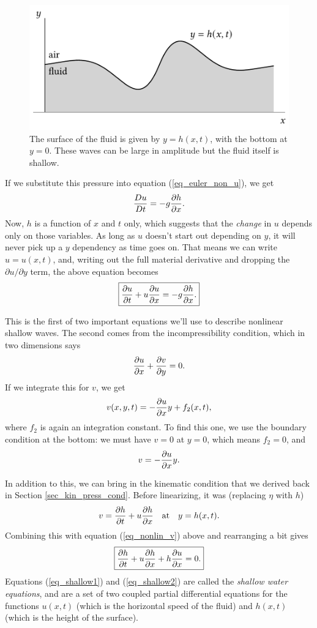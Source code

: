 \begin{figure}
\centering
\includegraphics[width=0.8\linewidth]{Figures/Chapter6/fig_nonlinear_wave}
\caption{The surface of the fluid is given by $y = h(x, t)$, with the bottom at $y=0$.  These waves can be large in amplitude but the fluid itself is shallow. }
\label{fig_nonlinear_wave}
\end{figure}

If we substitute this pressure into equation (\ref{eq_euler_non_u}), we get
\[
\frac{Du}{Dt} = -g \frac{\partial {h}}{\partial {x}}.
\]
Now, $h$ is a function of $x$ and $t$ only, which suggests that the \emph{change} in $u$ depends only on those variables.  As long as $u$ doesn't start out depending on $y$, it will never pick up a $y$ dependency as time goes on.  That means we can write $u = u(x, t)$, and, writing out the full material derivative and dropping the $\partial u / \partial y$ term, the above equation becomes
\begin{equation}
\label{eq_shallow1}
\boxed{
\frac{\partial {u}}{\partial {t}} + u\frac{\partial {u}}{\partial {x}} = -g \frac{\partial {h}}{\partial {x}}.
}
\end{equation}

This is the first of two important equations we'll use to describe nonlinear shallow waves.  The second comes from the incompressibility condition, which in two dimensions says
\[
\frac{\partial {u}}{\partial {x}} + \frac{\partial {v}}{\partial {y}} = 0.
\]
If we integrate this for $v$, we get
\[
v(x, y, t) = -\frac{\partial {u}}{\partial {x}} y + f_2(x, t),
\]
where $f_2$ is again an integration constant.  To find this one, we use the boundary condition at the bottom:  we must have $v = 0$ at $y=0$, which means $f_2 = 0$, and
\begin{equation}
\label{eq_nonlin_v}
v = -\frac{\partial {u}}{\partial {x}} y.
\end{equation}

In addition to this, we can bring in the kinematic condition that we derived back in Section \ref{sec_kin_press_cond}.  Before linearizing, it was (replacing $\eta$ with $h$)
\[
v = \frac{\partial {h}}{\partial {t}} + u\frac{\partial {h}}{\partial {x}} \quad \text{at} \quad y = h(x, t).
\]
Combining this with equation (\ref{eq_nonlin_v}) above and rearranging a bit gives
\begin{equation}
\label{eq_shallow2}
\boxed{
\frac{\partial {h}}{\partial {t}} + u\frac{\partial {h}}{\partial {x}} + h\frac{\partial {u}}{\partial {x}} = 0.
}
\end{equation}
Equations (\ref{eq_shallow1}) and (\ref{eq_shallow2}) are called the \emph{shallow water equations}, and are a set of two coupled partial differential equations for the functions $u(x, t)$ (which is the horizontal speed of the fluid) and $h(x, t)$ (which is the height of the surface).  


